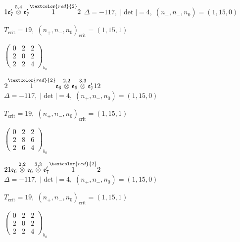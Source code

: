 \documentclass[10pt]{article}
\begin{document}
\smallskip

$1\mathfrak{e}_7'\overset{5,4}{\otimes}\mathfrak{e}_7'\overset{\textcolor{red}{2}}{1}2$ \quad $\Delta=-117,\; |\det|=4,\; (n_+,n_-,n_0)=(1,15,0)$

\hspace{1em}$T_{\text{crit}}=19,\; (n_+,n_-,n_0)_{\text{crit}}=(1,15,1)$

\hspace{2em}$\left(\begin{smallmatrix}0 & 2 & 2 \\ 2 & 0 & 2 \\ 2 & 2 & 4\end{smallmatrix}\right)_{\!b_0}$

\smallskip

$2\overset{\textcolor{red}{2}}{1}\mathfrak{e}_6\overset{2,2}{\otimes}\mathfrak{e}_6\overset{3,3}{\otimes}\mathfrak{e}_7'12$ \quad $\Delta=-117,\; |\det|=4,\; (n_+,n_-,n_0)=(1,15,0)$

\hspace{1em}$T_{\text{crit}}=19,\; (n_+,n_-,n_0)_{\text{crit}}=(1,15,1)$

\hspace{2em}$\left(\begin{smallmatrix}0 & 2 & 2 \\ 2 & 8 & 6 \\ 2 & 6 & 4\end{smallmatrix}\right)_{\!b_0}$

$21\mathfrak{e}_6\overset{2,2}{\otimes}\mathfrak{e}_6\overset{3,3}{\otimes}\mathfrak{e}_7'\overset{\textcolor{red}{2}}{1}2$ \quad $\Delta=-117,\; |\det|=4,\; (n_+,n_-,n_0)=(1,15,0)$

\hspace{1em}$T_{\text{crit}}=19,\; (n_+,n_-,n_0)_{\text{crit}}=(1,15,1)$

\hspace{2em}$\left(\begin{smallmatrix}0 & 2 & 2 \\ 2 & 0 & 2 \\ 2 & 2 & 4\end{smallmatrix}\right)_{\!b_0}$

\smallskip
\end{document}
